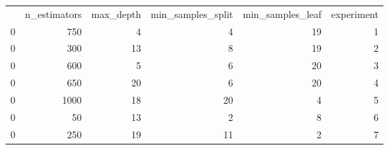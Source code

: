\begin{tabular}{lrrrrr}
 & n_estimators & max_depth & min_samples_split & min_samples_leaf & experiment \\
0 & 750 & 4 & 4 & 19 & 1 \\
0 & 300 & 13 & 8 & 19 & 2 \\
0 & 600 & 5 & 6 & 20 & 3 \\
0 & 650 & 20 & 6 & 20 & 4 \\
0 & 1000 & 18 & 20 & 4 & 5 \\
0 & 50 & 13 & 2 & 8 & 6 \\
0 & 250 & 19 & 11 & 2 & 7 \\
\end{tabular}
